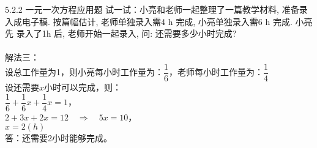 \documentclass[aspectratio=169]{ctexbeamer} %
\begin{document}
\begin{frame}[t]{5.2.2 一元一次方程应用题}
试一试：小亮和老师一起整理了一篇教学材料, 准备录入成电子稿. 按篇幅估计, 老师单独录入需4 h 完成, 小亮单独录入需6 h 完成. 小亮先
录入了1h 后, 老师开始一起录入, 问: 还需要多少小时完成? \\
\pause
\vspace{12pt} \\
解法三：\\
设总工作量为1，则小亮每小时工作量为：$\dfrac{1}{6}$，老师每小时工作量为：$\dfrac{1}{4}$\\
设还需要$x$小时可以完成，则：\\
\vspace{12pt} 
$\dfrac{1}{6} + \dfrac{1}{6}x + \dfrac{1}{4}x = 1$， \\
\vspace{12pt} 
$2 + 3x + 2x = 12 \quad \Rightarrow \quad 5x = 10$， \\
\vspace{12pt} 
$x = 2(h)$ \\
\vspace{12pt} 
答：还需要2小时能够完成。
\end{frame}
\end{document}
